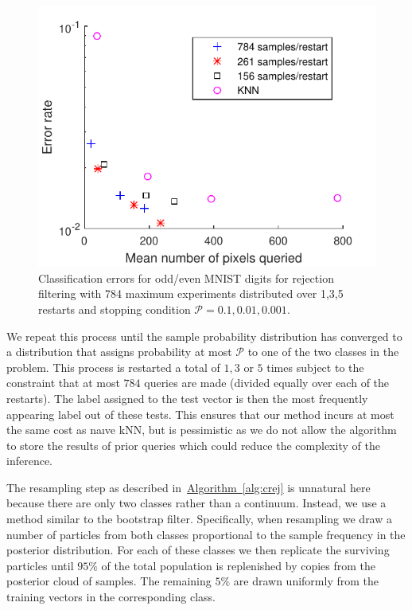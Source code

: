\documentclass[twoside]{article}
\newcommand{\alg}[1]{\hyperref[alg:#1]{Algorithm~\ref*{alg:#1}}}
\begin{document}
\begin{figure}
\includegraphics[width=\columnwidth]{ErrorPlot.pdf}
\caption{Classification errors for odd/even MNIST digits for rejection filtering with 784 maximum experiments distributed over 1,3,5 restarts and stopping condition $\mathcal{P}=0.1,0.01,0.001$.}\label{fig:errorplot}
\end{figure}

We repeat this process until the sample probability distribution has converged to a distribution that
assigns probability at most $\mathcal{P}$ to one of the two classes in the problem.  This process is restarted a total of
$1,3$ or $5$ times subject to the constraint that at most $784$ queries are made (divided equally over each of the restarts).
The label assigned to the test vector is then the most frequently appearing label out of these tests.  This ensures that our method
incurs at most the same cost as na\i ve kNN, but is pessimistic as we do not allow the algorithm to store the results of prior queries which could reduce the 
complexity of the inference.

 The resampling step as described in~\alg{crej} is unnatural here because there are only two classes rather than a continuum.  Instead, we use a method similar to the bootstrap filter.  Specifically, when resampling we draw a number of particles from both
classes proportional to the sample frequency in the posterior distribution.  For each of these classes we then replicate the surviving particles until $95\%$ of the total population is replenished
by copies from the posterior cloud of samples.  The remaining $5\%$ are drawn uniformly from the training vectors in the corresponding class.
\end{document}
